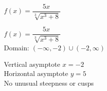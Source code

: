 {$f(x) = \dfrac{5x}{\sqrt[3]{x^{3} + 8}}$}
{$f(x) = \dfrac{5x}{\sqrt[3]{x^{3} + 8}}$\\
Domain: $(-\infty, -2) \cup (-2, \infty)$\\
\begin{center}
\end{center}

Vertical asymptote $x = -2$\\
Horizontal asymptote $y = 5$\\
No unusual steepness or cusps\\

\begin{center}
\end{center}}


